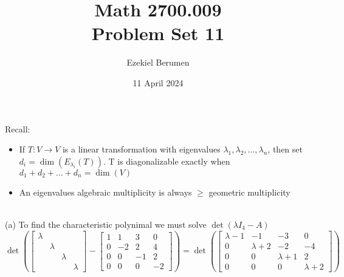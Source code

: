 \documentclass{report}
\title{\Huge{Math 2700.009}\\Problem Set 11}
\author{\huge{Ezekiel Berumen}}
\date{11 April 2024}
\begin{document}
\maketitle
\newpage

\begin{note}
Recall:
\begin{itemize}
\item If $T: V \rightarrow V$ is a linear transformation with eigenvalues $\lambda_1, \lambda_2, \ldots, \lambda_n$, then set $d_i=\operatorname{dim}(E_{\lambda_{i}}(T))$. T is diagonalizable exactly when $d_1 + d_2 + \ldots + d_n = \operatorname{dim}(V)$
\item An eigenvalues algebraic multiplicity is always $\ge$ geometric multiplicity
\end{itemize}
\end{note}
\sol \\
(a) To find the characteristic polynimal we must solve $\operatorname{det}(\lambda I_4 - A)$
$$
\det\left(\begin{bmatrix}
\lambda&&&\\
&\lambda&&\\
&&\lambda&\\
&&&\lambda
\end{bmatrix} - \begin{bmatrix}
1&1&3&0\\
0&-2&2&4\\
0&0&-1&2\\
0&0&0&-2
\end{bmatrix}
\right) =
\det\left(
\begin{bmatrix}
\lambda-1&-1&-3&0\\
0&\lambda+2&-2&-4\\
0&0&\lambda+1&2\\
0&0&0&\lambda+2
\end{bmatrix}
\right)
$$
\end{document}
